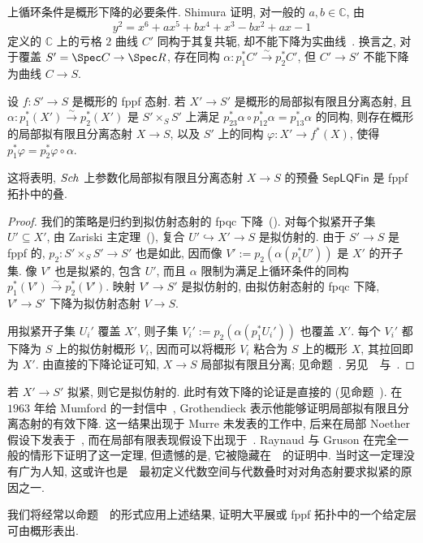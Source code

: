 \begin{remark}[上循环条件]\label{src:3.1.13}
上循环条件是概形下降的必要条件. Shimura 证明, 对一般的 $a,b\in\mathbb C$, 由
\[
y^2=x^6+ax^5+bx^4+x^3-bx^2+ax-1
\]
定义的 $\mathbb C$ 上的亏格 $2$ 曲线 $C'$ 同构于其复共轭, 却不能下降为实曲线~\cite{Shi72}. 换言之, 对于覆盖 $S'=\Spec\mathbb C\to\Spec\mathbb R$, 存在同构 $\alpha:p_1^*C'\xrightarrow{\sim}p_2^*C'$, 但 $C'\to S'$ 不能下降为曲线 $C\to S$.
\end{remark}
\begin{theorem}\label{src:3.1.14}
设 $f:S'\to S$ 是概形的 fppf 态射. 若 $X'\to S'$ 是概形的局部拟有限且分离态射, 且 $\alpha:p_1^*(X')\xrightarrow{\sim}p_2^*(X')$ 是 $S'\times_S S'$ 上满足 $p_{23}^*\alpha\circ p_{12}^*\alpha=p_{13}^*\alpha$ 的同构, 则存在概形的局部拟有限且分离态射 $X\to S$, 以及 $S'$ 上的同构 $\varphi:X'\to f^*(X)$, 使得 $p_1^*\varphi=p_2^*\varphi\circ\alpha$.
\end{theorem}
这将表明, $Sch$ 上参数化局部拟有限且分离态射 $X\to S$ 的预叠 $\mathsf{SepLQFin}$ 是 fppf 拓扑中的叠.
\begin{proof}
我们的策略是归约到拟仿射态射的 fpqc 下降~(). 对每个拟紧开子集 $U'\subseteq X'$, 由 Zariski 主定理~(), 复合 $U'\hookrightarrow X'\to S$ 是拟仿射的. 由于 $S'\to S$ 是 fppf 的, $p_2:S'\times_S S'\to S'$ 也是如此, 因而像 $V':=p_2(\alpha(p_1^*U'))$ 是 $X'$ 的开子集. 像 $V'$ 也是拟紧的, 包含 $U'$, 而且 $\alpha$ 限制为满足上循环条件的同构 $p_1^*(V')\xrightarrow{\sim}p_2^*(V')$. 映射 $V'\to S'$ 是拟仿射的, 由拟仿射态射的 fpqc 下降, $V'\to S'$ 下降为拟仿射态射 $V\to S$.

用拟紧开子集 $U_i'$ 覆盖 $X'$, 则子集 $V_i':=p_2(\alpha(p_1^*U_i'))$ 也覆盖 $X'$. 每个 $V_i'$ 都下降为 $S$ 上的拟仿射概形 $V_i$, 因而可以将概形 $V_i$ 粘合为 $S$ 上的概形 $X$, 其拉回即为 $X'$. 由直接的下降论证可知, $X\to S$ 局部拟有限且分离; 见命题~. 另见~\cite[引理 $5.7.2$]{GR71}~与~\cite[Tag 02W7]{SP}.
\end{proof}
\begin{remark}[历史说明]\label{src:3.1.15}
\begingroup
\setlength{\emergencystretch}{1em}
若 $X'\to S'$ 拟紧, 则它是拟仿射的. 此时有效下降的论证是直接的 (见命题~). 在 $1963$ 年给 Mumford 的一封信中~\cite[第 681 页]{Mum10}, Grothendieck 表示他能够证明局部拟有限且分离态射的有效下降. 这一结果出现于 Murre 未发表的工作中, 后来在局部 Noether 假设下发表于~\cite[命题 $1$]{Mur95}, 而在局部有限表现假设下出现于~\cite[引理 X.5.4]{SGA3II}. Raynaud 与 Gruson 在完全一般的情形下证明了这一定理, 但遗憾的是, 它被隐藏在~\cite[引理 $5.7.2$]{GR71}~的证明中. 当时这一定理没有广为人知, 这或许也是~\cite{Knu71,Art74b}~最初定义代数空间与代数叠时对对角态射要求拟紧的原因之一.

\par\endgroup
我们将经常以命题~~的形式应用上述结果, 证明大平展或 fppf 拓扑中的一个给定层可由概形表出.
\end{remark}
